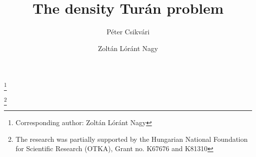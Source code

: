 \documentclass[12pt,a4paper]{amsart}
\numberwithin{equation}{section}
\begin{document}
\title{The density Tur\'an problem}

\author[P. Csikv\'ari]{P\'{e}ter Csikv\'{a}ri}
\address{E\"{o}tv\"{o}s Lor\'{a}nd University \\ Department of Computer Science
 \\ H-1117 Budapest
 \\ P\'{a}zm\'{a}ny P\'{e}ter s\'{e}t\'{a}ny 1/C \\ Hungary \& Alfr\'ed R\'enyi
 Institute of 
 Mathematics \\ H-1053 Budapest \\ Re\'altanoda u. 13-15. \\ Hungary}

\author[Z. L. Nagy]{Zolt\'an L\'or\'ant Nagy}

\address{E\"{o}tv\"{o}s Lor\'{a}nd University \\ Department of Computer Science
 \\ H-1117 Budapest
 \\ P\'{a}zm\'{a}ny P\'{e}ter s\'{e}t\'{a}ny 1/C \\ Hungary \& Alfr\'ed R\'enyi
 Institute of 
 Mathematics \\ H-1053 Budapest \\ Re\'altanoda u. 13-15. \\ Hungary}

\thanks{Corresponding author: Zolt\'an L\'or\'ant Nagy}

\thanks{The research  was partially supported by the
  Hungarian National Foundation for Scientific Research (OTKA), Grant no. 
K67676 and K81310} 



\date{}

 

\addtolength{\textheight}{2cm}

\theoremstyle{plain}
\newtheorem{theorem}{\bf Theorem}[section]
\newtheorem{lemma}[theorem]{\bf Lemma}
\newtheorem{cor}[theorem]{\bf Corollary}
\newtheorem{prop}[theorem]{\bf Proposition}
\newtheorem{conj}[theorem]{\bf Conjecture}
\newtheorem{claim}[theorem]{\bf Claim}
\newtheorem{construction}[theorem]{\bf Construction}
\newtheorem{Al}[theorem]{\bf Algorithm}
\newtheorem{counte}[theorem]{\bf Counterexample}

\theoremstyle{definition}
\newtheorem{example}[theorem]{\bf Example}
\newtheorem{remark}[theorem]{\bf Remark}
\newtheorem{defn}[theorem]{\bf Definition}
\newtheorem{problem}[theorem]{\bf Problem}
\newtheorem{obs}[theorem]{\bf Observation}
\newtheorem{nota}[theorem]{\bf Notation}
\end{document}
